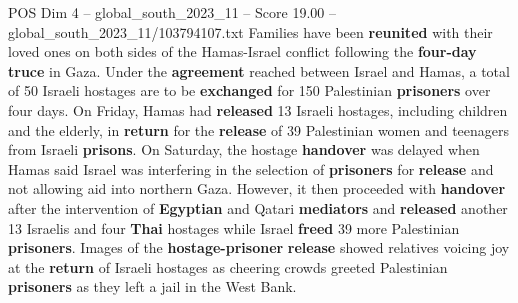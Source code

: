 \begin{textsample}{POS Dim 4 – global\_south\_2023\_11 – Score 19.00 – global\_south\_2023\_11/103794107.txt}  \label{ex:f4_pos_160}
Families have been \textbf{reunited} with their loved ones on both sides of the Hamas-Israel conflict following the \textbf{four-day} \textbf{truce} in Gaza.
Under the \textbf{agreement} reached between Israel and Hamas, a total of 50 Israeli hostages are to be \textbf{exchanged} for 150 Palestinian \textbf{prisoners} over four days.
On Friday, Hamas had \textbf{released} 13 Israeli hostages, including children and the elderly, in \textbf{return} for the \textbf{release} of 39 Palestinian women and teenagers from Israeli \textbf{prisons}.
On Saturday, the hostage \textbf{handover} was delayed when Hamas said Israel was interfering in the selection of \textbf{prisoners} for \textbf{release} and not allowing aid into northern Gaza.
However, it then proceeded with \textbf{handover} after the intervention of \textbf{Egyptian} and Qatari \textbf{mediators} and \textbf{released} another 13 Israelis and four \textbf{Thai} hostages while Israel \textbf{freed} 39 more Palestinian \textbf{prisoners}.
Images of the \textbf{hostage-prisoner} \textbf{release} showed relatives voicing joy at the \textbf{return} of Israeli hostages as cheering crowds greeted Palestinian \textbf{prisoners} as they left a jail in the West Bank.

\end{textsample}
